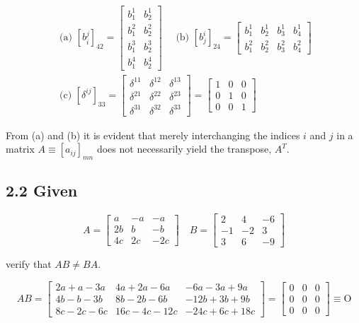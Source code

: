 \documentclass[10pt]{article}
\begin{document}
$$
\begin{gathered}
\text { (a) }\left[b_{i}^{j}\right]_{42}=\left[\begin{array}{ll}
b_{1}^{1} & b_{2}^{1} \\
b_{1}^{2} & b_{2}^{2} \\
b_{1}^{3} & b_{2}^{3} \\
b_{1}^{4} & b_{2}^{4}
\end{array}\right] \quad \text { (b) }\left[b_{j}^{i}\right]_{24}=\left[\begin{array}{llll}
b_{1}^{1} & b_{2}^{1} & b_{3}^{1} & b_{4}^{1} \\
b_{1}^{2} & b_{2}^{2} & b_{3}^{2} & b_{4}^{2}
\end{array}\right] \\
\text { (c) }\left[\delta^{i j}\right]_{33}=\left[\begin{array}{lll}
\delta^{11} & \delta^{12} & \delta^{13} \\
\delta^{21} & \delta^{22} & \delta^{23} \\
\delta^{31} & \delta^{32} & \delta^{33}
\end{array}\right]=\left[\begin{array}{lll}
1 & 0 & 0 \\
0 & 1 & 0 \\
0 & 0 & 1
\end{array}\right]
\end{gathered}
$$

From (a) and (b) it is evident that merely interchanging the indices $i$ and $j$ in a matrix $A \equiv\left[a_{i j}\right]_{m n}$ does not necessarily yield the transpose, $A^{T}$.

\subsection*{2.2 Given}
$$
A=\left[\begin{array}{ccc}
a & -a & -a \\
2 b & b & -b \\
4 c & 2 c & -2 c
\end{array}\right] \quad B=\left[\begin{array}{rrr}
2 & 4 & -6 \\
-1 & -2 & 3 \\
3 & 6 & -9
\end{array}\right]
$$

verify that $A B \neq B A$.

$$
A B=\left[\begin{array}{ccc}
2 a+a-3 a & 4 a+2 a-6 a & -6 a-3 a+9 a \\
4 b-b-3 b & 8 b-2 b-6 b & -12 b+3 b+9 b \\
8 c-2 c-6 c & 16 c-4 c-12 c & -24 c+6 c+18 c
\end{array}\right]=\left[\begin{array}{ccc}
0 & 0 & 0 \\
0 & 0 & 0 \\
0 & 0 & 0
\end{array}\right] \equiv \mathrm{O}
$$
\end{document}
